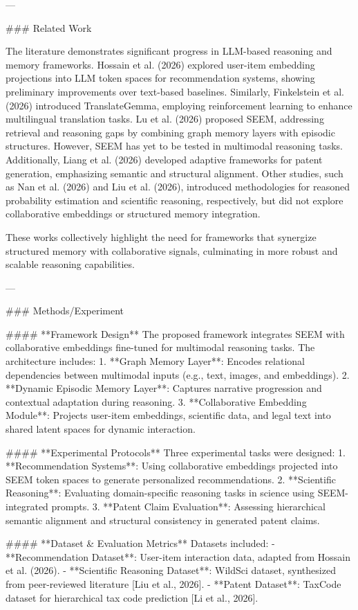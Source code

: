 ---

### Related Work  

The literature demonstrates significant progress in LLM-based reasoning and memory frameworks. Hossain et al. (2026) explored user-item embedding projections into LLM token spaces for recommendation systems, showing preliminary improvements over text-based baselines. Similarly, Finkelstein et al. (2026) introduced TranslateGemma, employing reinforcement learning to enhance multilingual translation tasks. Lu et al. (2026) proposed SEEM, addressing retrieval and reasoning gaps by combining graph memory layers with episodic structures. However, SEEM has yet to be tested in multimodal reasoning tasks. Additionally, Liang et al. (2026) developed adaptive frameworks for patent generation, emphasizing semantic and structural alignment. Other studies, such as Nan et al. (2026) and Liu et al. (2026), introduced methodologies for reasoned probability estimation and scientific reasoning, respectively, but did not explore collaborative embeddings or structured memory integration.

These works collectively highlight the need for frameworks that synergize structured memory with collaborative signals, culminating in more robust and scalable reasoning capabilities.

---

### Methods/Experiment  

#### **Framework Design**  
The proposed framework integrates SEEM with collaborative embeddings fine-tuned for multimodal reasoning tasks. The architecture includes:  
1. **Graph Memory Layer**: Encodes relational dependencies between multimodal inputs (e.g., text, images, and embeddings).  
2. **Dynamic Episodic Memory Layer**: Captures narrative progression and contextual adaptation during reasoning.  
3. **Collaborative Embedding Module**: Projects user-item embeddings, scientific data, and legal text into shared latent spaces for dynamic interaction.

#### **Experimental Protocols**  
Three experimental tasks were designed:  
1. **Recommendation Systems**: Using collaborative embeddings projected into SEEM token spaces to generate personalized recommendations.  
2. **Scientific Reasoning**: Evaluating domain-specific reasoning tasks in science using SEEM-integrated prompts.  
3. **Patent Claim Evaluation**: Assessing hierarchical semantic alignment and structural consistency in generated patent claims.

#### **Dataset & Evaluation Metrics**  
Datasets included:
- **Recommendation Dataset**: User-item interaction data, adapted from Hossain et al. (2026).  
- **Scientific Reasoning Dataset**: WildSci dataset, synthesized from peer-reviewed literature [Liu et al., 2026].  
- **Patent Dataset**: TaxCode dataset for hierarchical tax code prediction [Li et al., 2026].  

